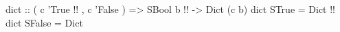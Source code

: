\begin{code}
dict
  :: ( c 'True  !!
     , c 'False
     )
  => SBool b  !!
  -> Dict (c b)
dict STrue  = Dict  !!
dict SFalse = Dict
\end{code}
